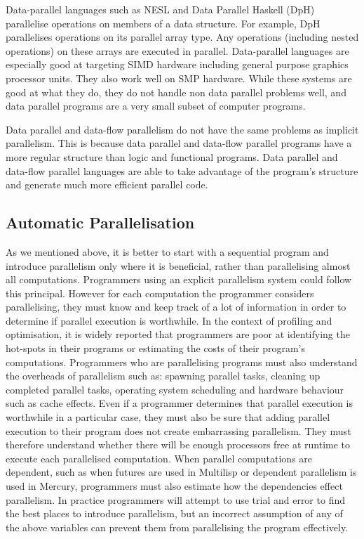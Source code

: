 Data-parallel languages such as
NESL \citep{blelloch:95:nesl} and
Data Parallel Haskell (DpH)
\citep{dph:2007:status_report,dph:2008:harnessing_the_multicores}
parallelise operations on members of a data structure.
For example,
DpH parallelises operations on its parallel array type.
Any operations (including nested operations) on these arrays are
executed in parallel.
Data-parallel languages are especially good at targeting SIMD hardware
including general purpose graphics processor units.
They also work well on SMP hardware.
While these systems are good at what they do,
they do not handle non data parallel problems well,
and data parallel programs are a very small subset of computer programs.

Data parallel and data-flow parallelism do not have the same
problems as implicit parallelism.
This is because data parallel and data-flow parallel programs have a
more regular structure than logic and functional programs.
Data parallel and data-flow parallel languages are able to take
advantage of the program's structure and generate much more efficient
parallel code.


\subsection{Automatic Parallelisation}
\label{sec:intro_auto_par}

As we mentioned above,
it is better to start with a sequential program and introduce parallelism
only where it is beneficial,
rather than parallelising almost all computations.
Programmers using an explicit parallelism system could follow this
principal.
However 
for each computation the programmer considers parallelising,
they must know and keep track of a lot of
information in order to determine if parallel execution is worthwhile.
In the context of profiling and optimisation,
it is widely reported that programmers are poor at identifying the
hot-spots in their programs or estimating the costs of their program's
computations.
Programmers who are parallelising programs must also understand the
overheads of parallelism such as:
spawning parallel tasks,
cleaning up completed parallel tasks,
operating system scheduling and
hardware behaviour such as cache effects.
Even if a programmer determines that parallel execution is worthwhile in
a particular case,
they must also be sure that adding parallel execution to their program
does not create embarrassing parallelism.
They must therefore understand whether there will be enough
processors free at runtime to execute each parallelised computation.
When parallel computations are dependent,
such as when futures are used in Multilisp or
dependent parallelism is used in Mercury,
programmers must also estimate how the dependencies effect parallelism.
In practice programmers will attempt to use trial and error to find the
best places to introduce parallelism,
but an incorrect assumption of any of the above variables can prevent them
from parallelising the program effectively.

